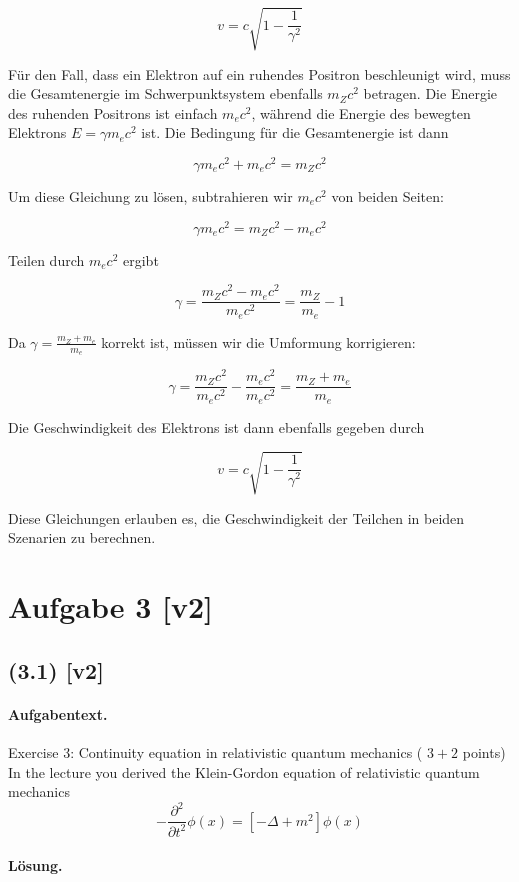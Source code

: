 \documentclass[11pt,a4paper]{article}
\begin{document}
\[
v = c \sqrt{1 - \frac{1}{\gamma^2}}
\]

Für den Fall, dass ein Elektron auf ein ruhendes Positron beschleunigt wird, muss die Gesamtenergie im Schwerpunktsystem ebenfalls \(m_Z c^2\) betragen. Die Energie des ruhenden Positrons ist einfach \(m_e c^2\), während die Energie des bewegten Elektrons \(E = \gamma m_e c^2\) ist. Die Bedingung für die Gesamtenergie ist dann

\[
\gamma m_e c^2 + m_e c^2 = m_Z c^2
\]

Um diese Gleichung zu lösen, subtrahieren wir \(m_e c^2\) von beiden Seiten:

\[
\gamma m_e c^2 = m_Z c^2 - m_e c^2
\]

Teilen durch \(m_e c^2\) ergibt

\[
\gamma = \frac{m_Z c^2 - m_e c^2}{m_e c^2} = \frac{m_Z}{m_e} - 1
\]

Da \(\gamma = \frac{m_Z + m_e}{m_e}\) korrekt ist, müssen wir die Umformung korrigieren:

\[
\gamma = \frac{m_Z c^2}{m_e c^2} - \frac{m_e c^2}{m_e c^2} = \frac{m_Z + m_e}{m_e}
\]

Die Geschwindigkeit des Elektrons ist dann ebenfalls gegeben durch

\[
v = c \sqrt{1 - \frac{1}{\gamma^2}}
\]

Diese Gleichungen erlauben es, die Geschwindigkeit der Teilchen in beiden Szenarien zu berechnen.


\section*{Aufgabe 3 [v2]}
\subsection*{(3.1) [v2]}
\paragraph{Aufgabentext.}
Exercise 3: Continuity equation in relativistic quantum mechanics ( $3+2$ points) In the lecture you derived the Klein-Gordon equation of relativistic quantum mechanics
$$
-\frac{\partial^2}{\partial t^2} \phi(x)=\left[-\Delta+m^2\right] \phi(x)
$$

\paragraph{Lösung.}
\end{document}
